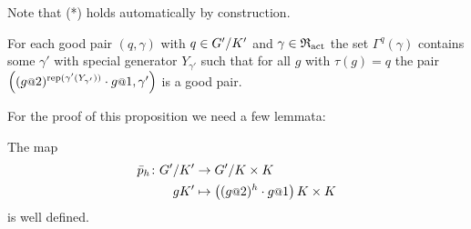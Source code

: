 \documentclass[a4paper,11pt]{amsart}
\begin{document}
Note that (*) holds automatically by construction.
 \begin{pro}\label{pro:existsNextPair}
 For each good pair $(q,\gamma)$ with $q\in{G'/K'}$ and $\gamma\in\mathfrak{R}_{\operatorname{act}}$ the set $\Gamma^q(\gamma)$ 
 contains some $\gamma'$ with special generator $Y_{\gamma'}$ such that for all $g$ with $\tau(g)=q$ the
 pair $\left((g\at{2})^{\rep(\gamma'(Y_{\gamma'}))}\cdot g\at{1},\gamma'\right)$ is a good pair.
\end{pro}
For the proof of this proposition we need a few lemmata:
%
%  
\begin{lem} \label{lem:pIsDefinedModK'}
 The map 
 \begin{align*} 
  \bar p_h\colon \RNK{G'}{K'} &\to \RNK{G'}{K\times K}\\
  gK'&\mapsto \left((g\at{2})^h\cdot g\at{1}\right){K\times K}
 \end{align*}
is well defined.
\end{lem}
\end{document}
